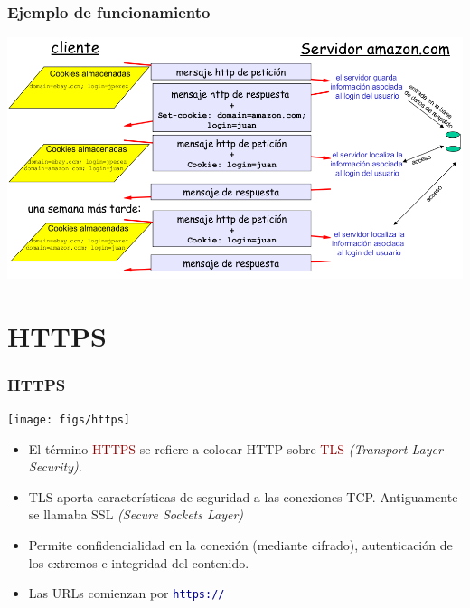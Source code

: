 \documentclass[hyperref={pdfpagelabels=true},ucs]{beamer}
\newcommand{\res}[1]{\textcolor{darkred}{#1}}
\begin{document}
\begin{frame}
\frametitle{Ejemplo de funcionamiento}

\begin{center}
\includegraphics[width=1.05\textwidth]{figs/5-p40}
\end{center}

\end{frame}






\section{HTTPS}


\begin{frame}[fragile]
\frametitle{HTTPS}

\begin{center}
\texttt{[image: figs/https]}  
\end{center}

\begin{itemize}
\item El término \res{HTTPS} se refiere a colocar HTTP sobre \res{TLS} \emph{(Transport Layer Security)}.
\item TLS aporta características de seguridad a las conexiones
  TCP. Antiguamente se llamaba SSL \emph{(Secure Sockets Layer)}
\item Permite confidencialidad en la conexión (mediante cifrado),
  autenticación de los extremos e integridad del contenido.
\item Las URLs comienzan por \textcolor{darkblue}{\Verb|https://|}
\end{itemize}

\end{frame}
\end{document}
